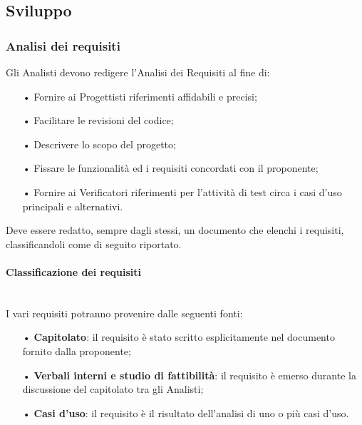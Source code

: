 \subsection{Sviluppo}
\subsubsection{Analisi dei requisiti}
Gli Analisti devono redigere l'Analisi dei Requisiti al fine di:
\begin{itemize}
    \item[•] Fornire ai Progettisti riferimenti affidabili e precisi;
    \item[•] Facilitare le revisioni del codice;
    \item[•] Descrivere lo scopo del progetto;
    \item[•] Fissare le funzionalità ed i requisiti concordati con il proponente;
    \item[•] Fornire ai Verificatori riferimenti per l'attività di test circa i casi d'uso principali e alternativi.
\end{itemize}

Deve essere redatto, sempre dagli stessi, un documento che elenchi i requisiti, classificandoli come di seguito riportato.

\paragraph{Classificazione dei requisiti}\mbox{}\\
I vari {requisiti} potranno provenire dalle seguenti fonti:
\begin{itemize}
    \item[•] \textbf{Capitolato}: il requisito è stato scritto esplicitamente nel documento fornito dalla proponente;
    \item[•] \textbf{Verbali interni e studio di fattibilità}: il requisito è emerso durante la discussione del capitolato tra gli Analisti;
    \item[•] \textbf{Casi d'uso}: il requisito è il risultato dell'analisi di uno o più casi d'uso.
\end{itemize}

